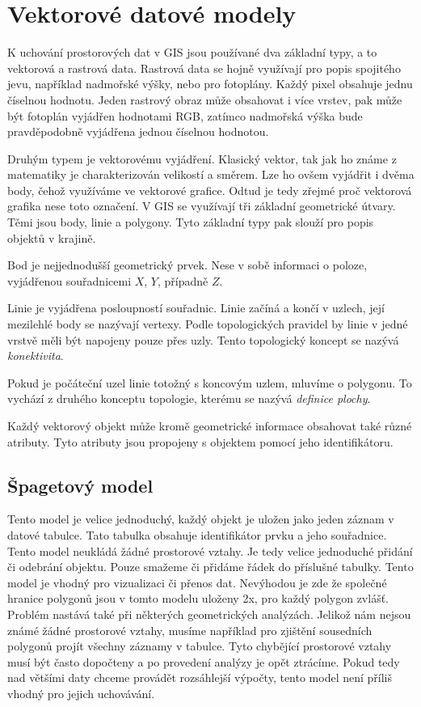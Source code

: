 \chapter{Vektorové datové modely}
\label{chap:vektorovedatovemodely}
	K uchování prostorových dat v GIS jsou používané dva základní typy, a to vektorová a rastrová data. Rastrová data se hojně využívají pro popis spojitého jevu, například nadmořské výšky, nebo pro fotoplány. Každý pixel obsahuje jednu číselnou hodnotu. Jeden rastrový obraz může obsahovat i více vrstev, pak může být fotoplán vyjádřen hodnotami RGB, zatímco nadmořská výška bude pravděpodobně vyjádřena jednou číselnou hodnotou.
	
	Druhým typem je vektorovému vyjádření. Klasický vektor, tak jak ho známe z matematiky je charakterizován velikostí a směrem. Lze ho ovšem vyjádřit i dvěma body, čehož využíváme ve vektorové grafice. Odtud je tedy zřejmé proč vektorová grafika nese toto označení. V GIS se využívají tři základní geometrické útvary. Těmi jsou body, linie a polygony. Tyto základní typy pak slouží pro popis objektů v krajině.
	
	Bod je nejjednodušší geometrický prvek. Nese v sobě informaci o poloze, vyjádřenou souřadnicemi $X$, $Y$, případně $Z$.
	
	Linie je vyjádřena posloupností souřadnic. Linie začíná a končí v uzlech, její mezilehlé body se nazývají vertexy. Podle topologických pravidel by linie v jedné vrstvě měli být napojeny pouze přes uzly. Tento topologický koncept se nazývá \textit{konektivita}.
	
	Pokud je počáteční uzel linie totožný s koncovým uzlem, mluvíme o polygonu. To vychází z druhého konceptu topologie, kterému se nazývá \textit{definice plochy}.
	
	Každý vektorový objekt může kromě geometrické informace obsahovat také různé atributy. Tyto atributy jsou propojeny s objektem pomocí jeho identifikátoru. \cite{kolar2003geograficke} \cite{tucek1997geograficke} \cite{vesely2007thesis}
	
\section{Špagetový model}
	Tento model je velice jednoduchý, každý objekt je uložen jako jeden záznam v datové tabulce. Tato tabulka obsahuje identifikátor prvku a jeho souřadnice. Tento model neukládá žádné prostorové vztahy. Je tedy velice jednoduché přidání či odebrání objektu. Pouze smažeme či přidáme řádek do příslušné tabulky. Tento model je vhodný pro vizualizaci či přenos dat. Nevýhodou je zde že společné hranice polygonů jsou v tomto modelu uloženy 2x, pro každý polygon zvlášť. Problém nastává také při některých geometrických analýzách. Jelikož nám nejsou známé žádné prostorové vztahy, musíme například pro zjištění sousedních polygonů projít všechny záznamy v tabulce. Tyto chybějící prostorové vztahy musí být často dopočteny a po provedení analýzy je opět ztrácíme. Pokud tedy nad většími daty chceme provádět rozsáhlejší výpočty, tento model není příliš vhodný pro jejich uchovávání. \cite{QGIS_software} \cite{tucek1997geograficke} \cite{kolar2003geograficke} \cite{vesely2007thesis}
	
